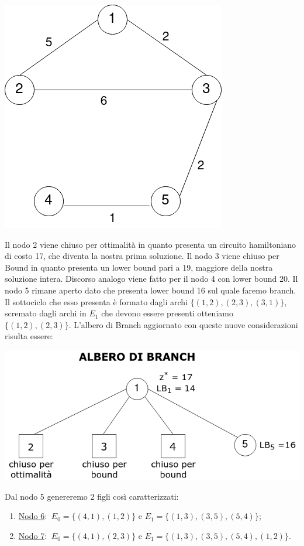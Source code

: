 \documentclass[
	article,			%
	12pt,				%
	oneside,			%
	a4paper,			%
	english,			%
	italian,				%
	sumario=tradicional,
	]{abntex2}
\begin{document}
\begin{center}
    \qquad
    \includegraphics[scale=0.26]{files/quinto1Tree.png}
\end{center}
Il nodo 2 viene chiuso per ottimalità in quanto presenta un circuito hamiltoniano di costo 17, che diventa la nostra prima soluzione. Il nodo 3 viene chiuso per Bound in quanto presenta un lower bound pari a 19, maggiore della nostra soluzione intera. Discorso analogo viene fatto per il nodo 4 con lower bound 20. Il nodo 5 rimane aperto dato che presenta lower bound 16 sul quale faremo branch. Il sottociclo che esso presenta è formato dagli archi $\{(1,2),(2,3),(3,1)\}$, scremato dagli archi in $E_1$ che devono essere presenti otteniamo $\{(1,2),(2,3)\}$.
\newline
L'albero di Branch aggiornato con queste nuove considerazioni risulta essere:
\begin{center}
    \includegraphics[scale=0.4]{files/alberoBranch2.png}
\end{center}
Dal nodo 5 genereremo 2 figli così caratterizzati:
\begin{enumerate}
    \item [] \underline{Nodo 6}: $\:E_0 = \{(4,1),(1,2)\}$ e $E_1 = \{(1,3),(3,5),(5,4)\}$;
    \item [] \underline{Nodo 7}: $\:E_0 = \{(4,1),(2,3)\}$ e $E_1 = \{(1,3),(3,5),(5,4), (1,2)\}$.
\end{enumerate}
\end{document}
